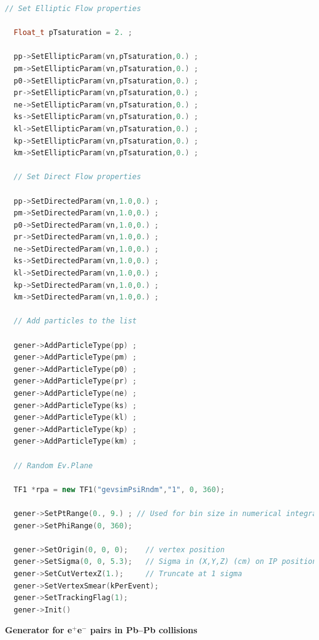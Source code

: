 \documentclass[12pt,a4paper,twoside]{article}
\begin{document}
\begin{lstlisting}[language=C++]
  // Set Elliptic Flow properties 	

  Float_t pTsaturation = 2. ;

  pp->SetEllipticParam(vn,pTsaturation,0.) ;
  pm->SetEllipticParam(vn,pTsaturation,0.) ;
  p0->SetEllipticParam(vn,pTsaturation,0.) ;
  pr->SetEllipticParam(vn,pTsaturation,0.) ;
  ne->SetEllipticParam(vn,pTsaturation,0.) ;
  ks->SetEllipticParam(vn,pTsaturation,0.) ;
  kl->SetEllipticParam(vn,pTsaturation,0.) ;
  kp->SetEllipticParam(vn,pTsaturation,0.) ;
  km->SetEllipticParam(vn,pTsaturation,0.) ;

  // Set Direct Flow properties	

  pp->SetDirectedParam(vn,1.0,0.) ;
  pm->SetDirectedParam(vn,1.0,0.) ;
  p0->SetDirectedParam(vn,1.0,0.) ;
  pr->SetDirectedParam(vn,1.0,0.) ;
  ne->SetDirectedParam(vn,1.0,0.) ;
  ks->SetDirectedParam(vn,1.0,0.) ;
  kl->SetDirectedParam(vn,1.0,0.) ;
  kp->SetDirectedParam(vn,1.0,0.) ;
  km->SetDirectedParam(vn,1.0,0.) ;

  // Add particles to the list

  gener->AddParticleType(pp) ;
  gener->AddParticleType(pm) ;
  gener->AddParticleType(p0) ;
  gener->AddParticleType(pr) ;
  gener->AddParticleType(ne) ;
  gener->AddParticleType(ks) ;
  gener->AddParticleType(kl) ;
  gener->AddParticleType(kp) ;
  gener->AddParticleType(km) ;

  // Random Ev.Plane

  TF1 *rpa = new TF1("gevsimPsiRndm","1", 0, 360);

  gener->SetPtRange(0., 9.) ; // Used for bin size in numerical integration
  gener->SetPhiRange(0, 360);

  gener->SetOrigin(0, 0, 0);    // vertex position
  gener->SetSigma(0, 0, 5.3);   // Sigma in (X,Y,Z) (cm) on IP position
  gener->SetCutVertexZ(1.);     // Truncate at 1 sigma
  gener->SetVertexSmear(kPerEvent); 
  gener->SetTrackingFlag(1);
  gener->Init()
\end{lstlisting}

\textbf{Generator for e$^+$e$^-$ pairs in Pb--Pb collisions}
\end{document}

